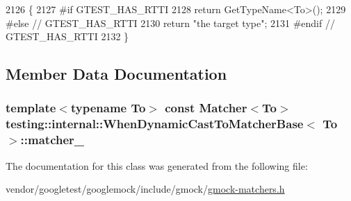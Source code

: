 \begin{DoxyCode}
2126                             \{
2127 \textcolor{preprocessor}{#if GTEST\_HAS\_RTTI}
2128     \textcolor{keywordflow}{return} GetTypeName<To>();
2129 \textcolor{preprocessor}{#else  // GTEST\_HAS\_RTTI}
2130     \textcolor{keywordflow}{return} \textcolor{stringliteral}{"the target type"};
2131 \textcolor{preprocessor}{#endif  // GTEST\_HAS\_RTTI}
2132   \}
\end{DoxyCode}


\subsection{Member Data Documentation}
\subsubsection[{\texorpdfstring{matcher\+\_\+}{matcher_}}]{\setlength{\rightskip}{0pt plus 5cm}template$<$typename To$>$ const {\bf Matcher}$<${\bf To}$>$ {\bf testing\+::internal\+::\+When\+Dynamic\+Cast\+To\+Matcher\+Base}$<$ {\bf To} $>$\+::matcher\+\_\+\hspace{0.3cm}{\ttfamily [protected]}}\hypertarget{classtesting_1_1internal_1_1WhenDynamicCastToMatcherBase_a40d697407c960bee8fe3b125f5ac8730}{}\label{classtesting_1_1internal_1_1WhenDynamicCastToMatcherBase_a40d697407c960bee8fe3b125f5ac8730}


The documentation for this class was generated from the following file\+:\begin{DoxyCompactItemize}
\item 
vendor/googletest/googlemock/include/gmock/\hyperlink{gmock-matchers_8h}{gmock-\/matchers.\+h}\end{DoxyCompactItemize}
